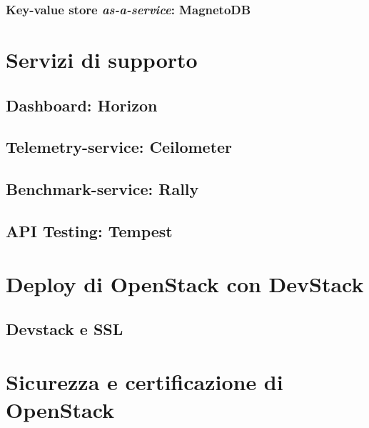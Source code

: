 \subsubsection{Key-value store \textit{as-a-service}: MagnetoDB}

\section{Servizi di supporto}
\subsection{Dashboard: Horizon}
\subsection{Telemetry-service: Ceilometer}
\subsection{Benchmark-service: Rally}
\subsection{API Testing: Tempest}
\section{Deploy di OpenStack con DevStack}
\subsection{Devstack e SSL}
\section{Sicurezza e certificazione di OpenStack}